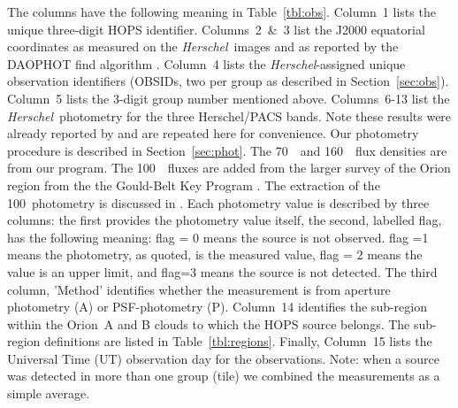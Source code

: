 \documentclass[manuscript]{aastex61}
\newcommand{\herschel}{{\em Herschel}}
\begin{document}
The columns have the following meaning in Table~\ref{tbl:obs}.  Column~1 lists the unique three-digit HOPS identifier.  Columns~2~\&~3 list the J2000 equatorial coordinates as measured on the \herschel\ images and as reported by the DAOPHOT find algorithm \citep{psfphotometry}.  Column~4 lists the \herschel-assigned unique observation identifiers (OBSIDs, two per group as described in Section~\ref{sec:obs}).  Column~5 lists the 3-digit group number mentioned above.  Columns~6-13 list the \herschel\ photometry for the three Herschel/PACS bands.  Note these results were already reported by \cite{furlan} and are repeated here for convenience.  Our photometry procedure is described in Section~\ref{sec:phot}.  The 70~\micron\ and 160~\micron\ flux densities are from our program.  The 100~\micron\ fluxes are added from the larger survey of the Orion region from the the Gould-Belt Key Program \citep{gb}.  The extraction of the 100\micron\ photometry is discussed in \cite{pbrpaper}.  Each photometry value is described by three columns: the first provides the photometry value itself, the second, labelled flag, has the following meaning:   flag = 0 means the source is not observed. flag =1 means the photometry, as quoted, is the measured value,  flag = 2 means the value is an upper limit, and flag=3 means the source is not detected.  The third column, 'Method' identifies whether the measurement is from aperture photometry (A) or PSF-photometry (P).  Column~14 identifies the sub-region within the Orion~A and B clouds to which the HOPS source belongs.  The sub-region definitions are listed in Table~\ref{tbl:regions}.  Finally, Column~15 lists the Universal Time (UT) observation day for the observations.  Note: when a source was detected in more than one group (tile) we combined the measurements as a simple average.
\end{document}
